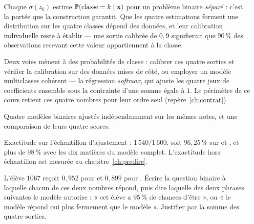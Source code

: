 Chaque $\sigma(z_k)$ estime $\mathbb{P}(\text{classe}=k \mid \mathbf{x})$ pour un problème
binaire \emph{séparé} : c'est la portée que la construction garantit. Que les
quatre estimations forment une distribution sur les quatre classes dépend des
données, et leur calibration individuelle reste à établir --- une sortie
calibrée de $0{,}9$ signifierait que $90\,\%$ des observations recevant cette
valeur appartiennent à la classe.

Deux voies mènent à des probabilités de classe : calibrer ces quatre sorties et
vérifier la calibration sur des données mises de côté, ou employer un modèle
multiclasses cohérent --- la régression \emph{softmax}, qui ajuste les quatre
jeux de coefficients ensemble sous la contrainte d'une somme égale à $1$. Le
périmètre de ce cours retient ces quatre nombres pour leur ordre seul
(repère~\ref{ch:contrat}).

\begin{resultat}
Quatre modèles binaires ajustés indépendamment sur les mêmes notes, et une
comparaison de leurs quatre scores.

Exactitude sur l'échantillon d'ajustement : $1\,540/1\,600$, soit $96{,}25\,\%$
sur \Herb et \Runes, et plus de $98\,\%$ avec les dix matières du modèle
complet. L'exactitude hors échantillon est mesurée au chapitre~\ref{ch:predire}.
\end{resultat}

\begin{exercice}
L'élève $1067$ reçoit $0{,}952$ pour \Gryf et $0{,}899$ pour \Rav. Écrire la
question binaire à laquelle chacun de ces deux nombres répond, puis dire laquelle
des deux phrases suivantes le modèle autorise : « cet élève a $95\,\%$ de chances
d'être \Gryf », ou « le modèle \Gryf répond oui plus fermement que le modèle
\Rav ». Justifier par la somme des quatre sorties.
\end{exercice}
